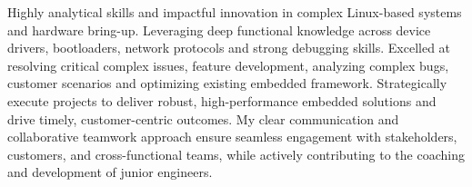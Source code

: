 %
%


%
\vspace{-3pt}%
%
\footnotesize{%
Highly analytical skills and impactful innovation in complex Linux-based systems and hardware bring-up. Leveraging deep functional knowledge across device drivers, bootloaders, network protocols and strong debugging skills.%
\newline%
Excelled at resolving critical complex issues, feature development, analyzing complex bugs, customer scenarios and optimizing existing embedded framework.%
\newline%
Strategically execute projects to deliver robust, high-performance embedded solutions and drive timely, customer-centric outcomes.
\newline%
My clear communication and collaborative teamwork approach ensure seamless engagement with stakeholders, customers, and cross-functional teams, while actively contributing to the coaching and development of junior engineers.%
\vspace{7pt}%
}
%
%
%
\vspace{-12pt}%
%
\vspace{-\topsep}\vspace{2pt}
